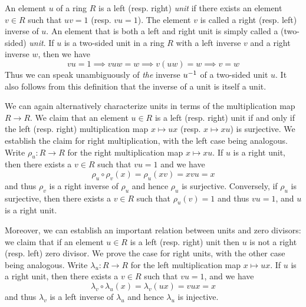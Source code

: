 \begin{example}
    An element \(u\) of a ring \(R\) is a left (resp. right) \emph{unit} if
    there exists an element \(v \in R\) such that \(uv = 1\) (resp. \(vu = 1\)).
    The element \(v\) is called a right (resp. left) inverse of \(u\). An
    element that is both a left and right unit is simply called a (two-sided)
    \emph{unit}. If \(u\) is a two-sided unit in a ring \(R\) with a left
    inverse \(v\) and a right inverse \(w\), then we have
    \[
        vu = 1 \implies vuw = w \implies v(uw) = w \implies v = w
    \]
    Thus we can speak unambiguously of \emph{the} inverse \(u^{-1}\) of a
    two-sided unit \(u\). It also follows from this definition that the inverse
    of a unit is itself a unit.

    We can again alternatively characterize units in terms of the multiplication
    map \(R \to R\). We claim that an element \(u \in R\) is a left (resp.
    right) unit if and only if the left (resp. right) multiplication map \(x
    \mapsto ux\) (resp. \(x \mapsto xu\)) is surjective. We establish the claim
    for right multiplication, with the left case being analogous. Write \(\rho_u
    : R \to R\) for the right multiplication map \(x \mapsto xu\). If \(u\) is a
    right unit, then there exists a \(v \in R\) such that \(vu = 1\) and we have
    \[
        \rho_u \circ \rho_v(x) = \rho_u(xv) = xvu = x
    \]
    and thus \(\rho_v\) is a right inverse of \(\rho_u\) and hence \(\rho_u\) is
    surjective. Conversely, if \(\rho_u\) is surjective, then there exists a \(v
    \in R\) such that \(\rho_u(v) = 1\) and thus \(vu = 1\), and \(u\) is a
    right unit.

    Moreover, we can establish an important relation between units and zero
    divisors: we claim that if an element \(u \in R\) is a left (resp. right)
    unit then \(u\) is not a right (resp. left) zero divisor. We prove the case
    for right units, with the other case being analogous. Write \(\lambda_u : R
    \to R\) for the left multiplication map \(x \mapsto ux\). If \(u\) is a
    right unit, then there exists a \(v \in R\) such that \(vu = 1\), and we
    have
    \[
        \lambda_v \circ \lambda_u(x) = \lambda_v(ux) = vux = x
    \]
    and thus \(\lambda_v\) is a left inverse of \(\lambda_u\) and hence
    \(\lambda_u\) is injective. 


\end{example}
